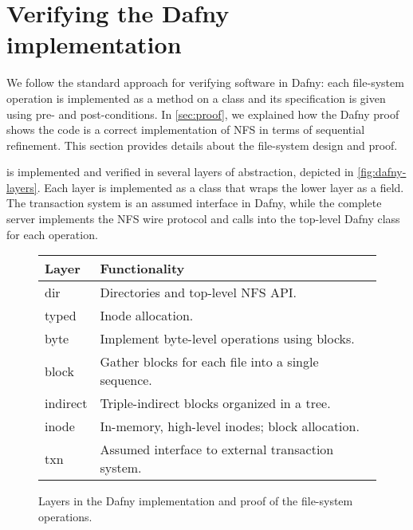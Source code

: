 \section{Verifying the Dafny implementation}%
\label{sec:design}

We follow the standard approach for verifying software in Dafny: each
file-system operation is implemented as a method on a class and its
specification is given using pre- and post-conditions. In \autoref{sec:proof},
we explained how the Dafny proof shows the code is a correct implementation of NFS in terms of sequential refinement. This
section provides details about the file-system design and proof.


\sys is implemented and verified in several layers of abstraction, depicted in
\autoref{fig:dafny-layers}. Each layer is implemented as a class that wraps the
lower layer as a field. The transaction system is an assumed interface in Dafny,
while the complete server implements the NFS wire protocol and calls into the
top-level Dafny class for each operation.


\begin{figure}
\small \centering
\begin{tabular}{ll}
  \toprule
  \textbf{Layer} & \textbf{Functionality} \\
  \midrule
  dir & Directories and top-level NFS API. \\
  typed & Inode allocation. \\
  byte & Implement byte-level operations using blocks. \\
  block & Gather blocks for each file into a single sequence. \\
  indirect & Triple-indirect blocks organized in a tree. \\
  inode & In-memory, high-level inodes; block allocation. \\
  txn & Assumed interface to external transaction system. \\
  \bottomrule
\end{tabular}
\caption{Layers in the Dafny implementation and proof of the file-system
operations.}
\label{fig:dafny-layers}
\end{figure}

